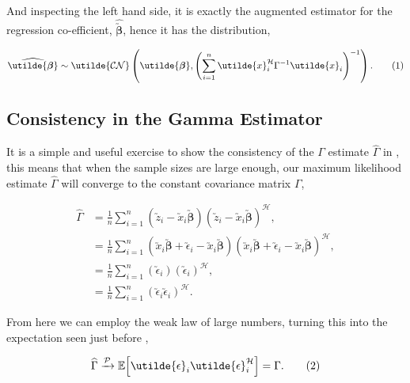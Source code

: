 \documentclass[honours,12pt]{unswthesis}
\newcommand{\E}{\mathbb{E}}
\newcommand{\ct}{\mathcal{H}}
\newcommand\numberthis{\addtocounter{equation}{1}\tag{\theequation}}
\numberwithin{equation}{section}
\begin{document}
\noindent And inspecting the left hand side, it is exactly the augmented estimator for the regression co-efficient, $\widehat{\utilde{\bm{\beta}}}$, hence it has the distribution,

\begin{align*}
	\widehat{\utilde{\bm{\beta}}} \sim \utilde{\mathcal{CN}} \left( \utilde{\bm{\beta}}, \left( \sum_{i = 1}^{n} \utilde{x}_{i}^{\ct} \Gamma^{-1} \utilde{x}_{i} \right)^{-1} \right). \numberthis \label{distributionbeta}
\end{align*}

\subsection{Consistency in the Gamma Estimator}

It is a simple and useful exercise to show the consistency of the $\Gamma$ estimate $\widehat{\Gamma}$ in , this means that when the sample sizes are large enough, our maximum likelihood estimate $\widehat{\Gamma}$ will converge to the constant covariance matrix $\Gamma$,

\begin{align*}
	\widehat{\Gamma} &= \frac{1}{n} \sum_{i = 1}^{n} \left( \utilde{z}_{i} - \utilde{x}_{i} \utilde{\bm{\beta}} \right) \left( \utilde{z}_{i} - \utilde{x}_{i} \utilde{\bm{\beta}} \right)^{\ct}, \\
	&= \frac{1}{n} \sum_{i = 1}^{n} \left( \utilde{x}_{i} \utilde{\bm{\beta}} + \utilde{\epsilon}_{i} - \utilde{x}_{i} \utilde{\bm{\beta}} \right) \left( \utilde{x}_{i} \utilde{\bm{\beta}} + \utilde{\epsilon}_{i} - \utilde{x}_{i} \utilde{\bm{\beta}} \right)^{\ct}, \\
	&= \frac{1}{n} \sum_{i = 1}^{n} \left( \utilde{\epsilon}_{i} \right) \left( \utilde{\epsilon}_{i} \right)^{\ct}, \\
	&= \frac{1}{n} \sum_{i = 1}^{n} \left( \utilde{\epsilon}_{i} \utilde{\epsilon}_{i} \right)^{\ct}.
\end{align*}

\noindent From here we can employ the weak law of large numbers, turning this into the expectation seen just before ,

\begin{align*}
	\widehat{\Gamma} \xrightarrow{ \mathcal{P}} \E{ \left[ \utilde{\epsilon}_{i} \utilde{\epsilon}_{i}^{\ct} \right]} = \Gamma. \numberthis \label{gammaconsistent}
\end{align*}
\end{document}
